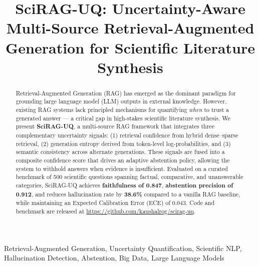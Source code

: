 \documentclass[conference]{IEEEtran}
\begin{document}
\title{SciRAG-UQ: Uncertainty-Aware Multi-Source Retrieval-Augmented\\
Generation for Scientific Literature Synthesis}

\author{
}

\maketitle

\begin{abstract}
Retrieval-Augmented Generation (RAG) has emerged as the dominant paradigm for
grounding large language model (LLM) outputs in external knowledge. However,
existing RAG systems lack principled mechanisms for quantifying \emph{when} to
trust a generated answer --- a critical gap in high-stakes scientific literature
synthesis. We present \textbf{SciRAG-UQ}, a multi-source RAG framework that
integrates three complementary uncertainty signals: (1) retrieval confidence from
hybrid dense--sparse retrieval, (2) generation entropy derived from token-level
log-probabilities, and (3) semantic consistency across alternate generations.
These signals are fused into a composite confidence score that drives an
adaptive abstention policy, allowing the system to withhold answers when evidence
is insufficient. Evaluated on a curated benchmark of 500 scientific questions
spanning factual, comparative, and unanswerable categories, SciRAG-UQ achieves
\textbf{faithfulness of 0.847}, \textbf{abstention precision of 0.912}, and
reduces hallucination rate by \textbf{38.6\%} compared to a vanilla RAG baseline,
while maintaining an Expected Calibration Error (ECE) of 0.043. Code and
benchmark are released at \url{https://github.com/kaushalrog/scirag-uq}.
\end{abstract}

\begin{IEEEkeywords}
Retrieval-Augmented Generation, Uncertainty Quantification, Scientific NLP,
Hallucination Detection, Abstention, Big Data, Large Language Models
\end{IEEEkeywords}

\end{document}
